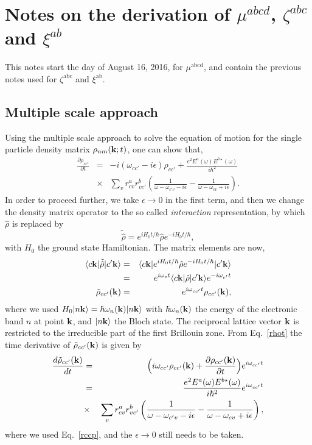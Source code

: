 \documentclass[floatfix,prb,aps,superscriptaddress,11pt]{revtex4}
\begin{document}
\section{Notes on the derivation of $\mu^{abcd}$, $\zeta^{abc}$ and $\xi^{ab}$}

This notes start the day of August 16, 2016, for
$\mu^{\mathrm{abcd}}$, and contain the previous notes used for
$\zeta^{\mathrm{abc}}$ and $\xi^{\mathrm{ab}}$. 



\subsection{Multiple scale approach}
Using the multiple  scale  approach to solve the equation of motion for the single particle density matrix
$\rho_{nm}(\mathbf{k};t)$, one can show that,\cite{nastosPRB07}
\begin{eqnarray}\label{rccp}
\frac{\partial\rho_{cc'}}{\partial  t}
&=&
-i \left(\omega_{cc'}-i\epsilon\right)
\rho_{cc'}
+\frac{e^2E^a(\omega)E^{b\star}(\omega)}{i\hbar^2}
\nonumber\\
&\times&
\sum_v
r^a_{cv}r^b_{vc'}
\left(
\frac{1}{\omega-\omega_{c'v}-i\epsilon}
-
\frac{1}
{\omega-\omega_{cv}+i\epsilon}
\right).
\end{eqnarray}
In order to proceed further, we take $\epsilon \rightarrow 0$  in the
first term, and then we change the density matrix operator to the so
called {\it interaction} representation, by which $\hat\rho$ is replaced
by 
\begin{equation}\label{rhoi}
\tilde{\hat{\rho}}=e^{iH_0t/\hbar}\hat\rho e^{-iH_0t/\hbar}
,
\end{equation}
with $H_0$ the ground state Hamiltonian.
The matrix elements are now,
\begin{eqnarray}\label{rhot}
\langle c\mathbf{k} |
\tilde{\hat\rho}
| c'\mathbf{k} \rangle
&=&
\langle c\mathbf{k} |
e^{iH_0t/\hbar}\hat\rho e^{-iH_0t/\hbar}
| c'\mathbf{k} \rangle
\nonumber\\
&=&
e^{i\omega_c t}
\langle c\mathbf{k} |
\hat\rho
| c'\mathbf{k} \rangle
 e^{-i\omega_{c'}t}
\nonumber\\
\tilde\rho_{cc'}(\mathbf{k}) 
&=&
e^{i\omega_{cc'}t}
\rho_{cc'}(\mathbf{k}) 
,
\end{eqnarray}
where we used $H_0| n\mathbf{k} \rangle=\hbar\omega_n(\mathbf{k})| n\mathbf{k} \rangle$ with $\hbar\omega_n(\mathbf{k})$
the energy of the electronic band $n$ at point $\mathbf{k}$, and
$| n\mathbf{k} \rangle$ the Bloch state. The reciprocal lattice vector $\mathbf{k}$ is
restricted to the irreducible part of the first Brillouin zone. From
Eq.~\eqref{rhot} the
time derivative of $\tilde\rho_{cc'}(\mathbf{k})$ is given by
\begin{eqnarray}\label{dtrho}
\frac{d\tilde\rho_{cc'}(\mathbf{k})}{dt}
&=&
\Big(
i\omega_{cc'}
\rho_{cc'}(\mathbf{k})
+
\frac{\partial\rho_{cc'}(\mathbf{k})}{\partial t}
\Big)
e^{i\omega_{cc'}t}
\nonumber\\
&=&
\frac{e^2E^a(\omega)E^{b\star}(\omega)}{i\hbar^2}
e^{i\omega_{cc'}t}
\nonumber\\
&\times&
\sum_v
r^a_{cv}r^b_{vc'}
\left(
\frac{1}{\omega-\omega_{c'v}-i\epsilon}
-
\frac{1}
{\omega-\omega_{cv}+i\epsilon}
\right)
,
\end{eqnarray}
where we used Eq.~\eqref{rccp}, and the  $\epsilon \rightarrow 0$
still needs to be taken.
\end{document}
